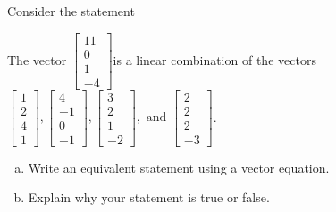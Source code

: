 
\begin{exerciseStatement}


Consider the statement 
\begin{center}\begin{minipage}{0.8\textwidth}
 The vector \( \left[\begin{array}{c}
11 \\
0 \\
1 \\
-4
\end{array}\right] \)is a linear combination of the vectors \( \left[\begin{array}{c}
1 \\
2 \\
4 \\
1
\end{array}\right] , \left[\begin{array}{c}
4 \\
-1 \\
0 \\
-1
\end{array}\right] , \left[\begin{array}{c}
3 \\
2 \\
1 \\
-2
\end{array}\right] , \text{ and } \left[\begin{array}{c}
2 \\
2 \\
2 \\
-3
\end{array}\right] \). 
\end{minipage}\end{center}
    


\begin{enumerate}[(a)]
\item  Write an equivalent statement using a vector equation.
\item  Explain why your statement is true or false.
\end{enumerate}
    
\end{exerciseStatement}
    
